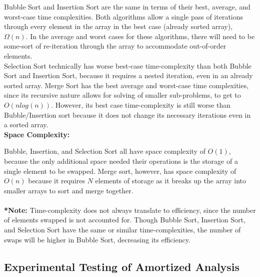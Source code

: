 \documentclass[12pt]{extarticle}
\begin{document}
Bubble Sort and Insertion Sort are the same in terms of their best, average, and worst-case time complexities. Both algorithms allow a single pass of iterations through every element in the array in the best case (already sorted array), $\Omega(n)$. In the average and worst cases for these algorithms, there will need to be some-sort of re-iteration through the array to accommodate out-of-order elements.\\ 

Selection Sort technically has worse best-case time-complexity than both Bubble Sort and Insertion Sort, because it requires a nested iteration, even in an already sorted array. Merge Sort has the best average and worst-case time complexities, since its recursive nature allows for solving of smaller sub-problems, to get to $O(nlog(n))$. However, its best case time-complexity is still worse than Bubble/Insertion sort because it does not change its necessary iterations even in a sorted array. 
\vspace{12pt}\\
\textbf{Space Complexity:}
\vspace{6pt}

Bubble, Insertion, and Selection Sort all have space complexity of $O(1)$, because the only additional space needed their operations is the storage of a single element to be swapped. Merge sort, however, has space complexity of $O(n)$ because it requires $N$ elements of storage as it breaks up the array into smaller arrays to sort and merge together. 
\\
\\
\textbf{*Note: }Time-complexity does not always translate to efficiency, since the number of elements swapped is not accounted for. Though Bubble Sort, Insertion Sort, and Selection Sort have the same or similar time-complexities, the number of swaps will be higher in Bubble Sort, decreasing its efficiency. 

\subsection{Experimental Testing of Amortized Analysis}
\end{document}
